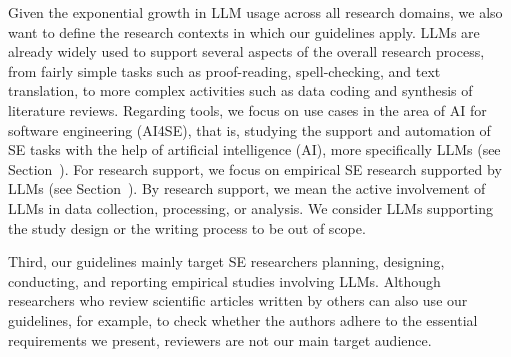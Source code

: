 
Given the exponential growth in LLM usage across all research domains, we also want to define the research contexts in which our guidelines apply.
LLMs are already widely used to support several aspects of the overall research process, from fairly simple tasks such as proof-reading, spell-checking, and text translation, to more complex activities such as data coding and synthesis of literature reviews.
Regarding tools, we focus on use cases in the area of AI for software engineering (AI4SE), that is, studying the support and automation of SE tasks with the help of artificial intelligence (AI), more specifically LLMs (see Section~\llmsforengineers).
For research support, we focus on empirical SE research supported by LLMs (see Section~\llmsforresearcher).
By research support, we mean the active involvement of LLMs in data collection, processing, or analysis.
We consider LLMs supporting the study design or the writing process to be out of scope.


Third, our guidelines mainly target SE researchers planning, designing, conducting, and reporting empirical studies involving LLMs.
Although researchers who review scientific articles written by others can also use our guidelines, for example, to check whether the authors adhere to the essential \must requirements we present, reviewers are not our main target audience.
